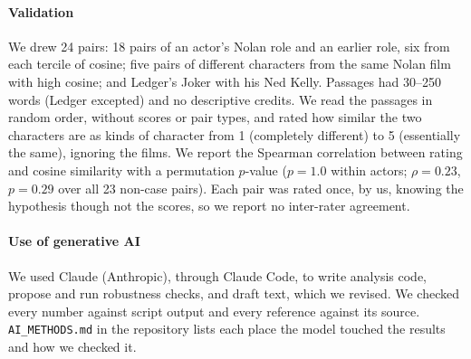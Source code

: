\documentclass[9pt,twocolumn,twoside]{pnas-new}
\begin{document}
{\paragraph*{Validation} We drew 24 pairs: 18 pairs of an actor's Nolan role and an earlier role, six from each tercile of cosine; five pairs of different characters from the same Nolan film with high cosine; and Ledger's Joker with his Ned Kelly. Passages had 30--250 words (Ledger excepted) and no descriptive credits. We read the passages in random order, without scores or pair types, and rated how similar the two characters are as kinds of character from 1 (completely different) to 5 (essentially the same), ignoring the films. We report the Spearman correlation between rating and cosine similarity with a permutation $p$-value ($p = 1.0$ within actors; $\rho = 0.23$, $p = 0.29$ over all 23 non-case pairs). Each pair was rated once, by us, knowing the hypothesis though not the scores, so we report no inter-rater agreement.

\paragraph*{Use of generative AI} We used Claude (Anthropic), through Claude Code, to write analysis code, propose and run robustness checks, and draft text, which we revised. We checked every number against script output and every reference against its source. \texttt{AI\_METHODS.md} in the repository lists each place the model touched the results and how we checked it.\par
}
\showmatmethods{}

\newpage
{}
\showacknow{}


\bibsplit[9]


\end{document}
